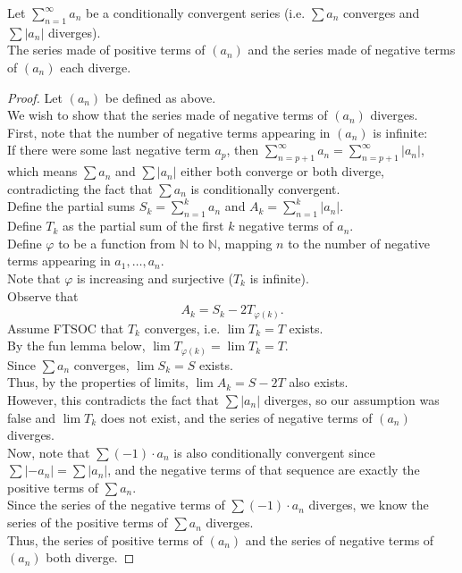 \documentclass{article}
\newenvironment{theorem}[1]{\renewcommand\theinnercustomthm{#1}\innercustomthm}
  {\endinnercustomthm}
\begin{document}
\newpage{}
\begin{theorem}{6}
    Let $\sum\limits_{n=1}^\infty a_n$ be a conditionally convergent series (i.e. $\sum a_n$ converges and $\sum |a_n|$ diverges). \\
    The series made of positive terms of $(a_n)$ and the series made of negative terms of $(a_n)$ each diverge.
\end{theorem}
\begin{proof}
    Let $(a_n)$ be defined as above.  \\
    We wish to show that the series made of negative terms of $(a_n)$ diverges. \\
    First, note that the number of negative terms appearing in $(a_n)$ is infinite: \\
    If there were some last negative term $a_p$, then $\sum\limits_{n=p+1}^\infty a_n = \sum\limits_{n=p+1}^\infty |a_n|$, which means $\sum a_n$ and $\sum |a_n|$ either both converge or both diverge, contradicting the fact that $\sum a_n$ is conditionally convergent. \\
    Define the partial sums $S_k = \sum\limits_{n=1}^k a_n$ and $A_k = \sum\limits_{n=1}^k |a_n|$. \\
    Define $T_k$ as the partial sum of the first $k$ negative terms of $a_n$. \\
    Define $\varphi$ to be a function from $\mathbb N$ to $\mathbb N$, mapping $n$ to the number of negative terms appearing in $a_1,\dots,a_n$. \\
    Note that $\varphi$ is increasing and surjective ($T_k$ is infinite). \\
    Observe that \[A_k = S_k -2T_{\varphi(k)}.\]
    Assume FTSOC that $T_k$ converges, i.e. $\lim T_k = T$ exists. \\
    By the fun lemma below, $\lim T_{\varphi(k)} = \lim T_k = T$. \\
    Since $\sum a_n$ converges, $\lim S_k = S$ exists. \\
    Thus, by the properties of limits, $\lim A_k = S - 2T$ also exists. \\
    However, this contradicts the fact that $\sum |a_n|$ diverges, so our assumption was false and $\lim T_k$ does not exist, and the series of negative terms of $(a_n)$ diverges. \\
    Now, note that $\sum (-1)\cdot a_n$ is also conditionally convergent since $\sum |-a_n| = \sum |a_n|$, and the negative terms of that sequence are exactly the positive terms of $\sum a_n$. \\
    Since the series of the negative terms of $\sum (-1)\cdot a_n$ diverges, we know the series of the positive terms of $\sum a_n$ diverges. \\
    Thus, the series of positive terms of $(a_n)$ and the series of negative terms of $(a_n)$ both diverge.
\end{proof}
\end{document}
